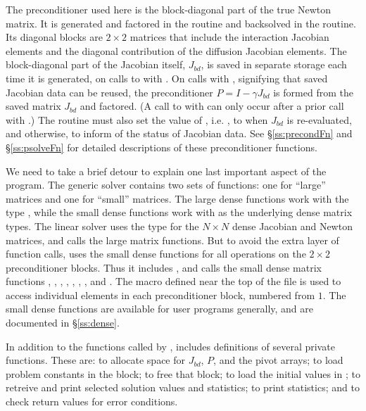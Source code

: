The preconditioner used here is the block-diagonal part of the true Newton
matrix.  It is generated and factored in the  routine and
backsolved in the  routine.   Its diagonal blocks are $2 \times 2$
matrices that include the interaction Jacobian elements and the diagonal
contribution of the diffusion Jacobian elements.  The block-diagonal part of
the Jacobian itself, $J_{bd}$, is saved in separate storage each time it is
generated, on calls to  with .
On calls with , signifying that saved Jacobian data
can be reused, the preconditioner $P = I - \gamma J_{bd}$ is formed from the
saved matrix $J_{bd}$ and factored.  (A call to  with
 can only occur after a prior call with
.)  The  routine must also set the value
of , i.e. , to  when $J_{bd}$ is re-evaluated,
and  otherwise, to inform {\cvspgmr} of the status of Jacobian data.
See \S\ref{ss:precondFn} and \S\ref{ss:psolveFn} for detailed descriptions
of these preconditioner functions.

We need to take a brief detour to explain one last important aspect of
the  program.  The generic {\dense} solver contains two
sets of functions: one for ``large'' matrices and one for ``small''
matrices.  The large dense functions work with the type ,
while the small dense functions work with  as the
underlying dense matrix types.  The {\cvdense} linear solver uses the
type  for the $N \times N$ dense Jacobian and Newton
matrices, and calls the large matrix functions.  But to avoid the
extra layer of function calls,  uses the small dense
functions for all operations on the $2 \times 2$ preconditioner blocks.  
Thus it includes , and calls the small dense matrix
functions , , , , 
, , , and .  The macro
 defined near the top of the file is used to access
individual elements in each preconditioner block, numbered from $1$.
The small dense functions are available for {\cvode} user programs
generally, and are documented in \S\ref{ss:dense}.

In addition to the functions called by {\cvode},  includes
definitions of several private functions.  These are: 
to allocate space for $J_{bd}$, $P$, and the pivot arrays; 
to load problem constants in the  block;  to free
that block;  to load the initial values in ; 
 to retreive and print selected solution values and
statistics;  to print statistics; and 
to check return values for error conditions.

